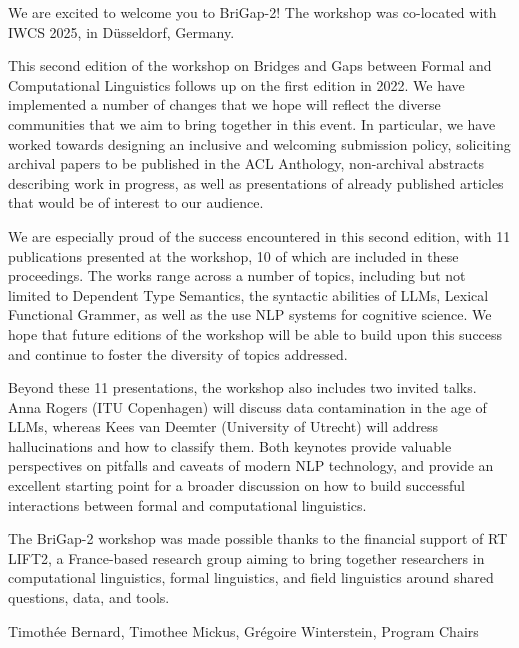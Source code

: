 We are excited to welcome you to BriGap-2!
The workshop was co-located with IWCS 2025, in Düsseldorf, Germany.

This second edition of the workshop on Bridges and Gaps between Formal and Computational Linguistics follows up on the first edition in 2022.
We have implemented a number of changes that we hope will reflect the diverse communities that we aim to bring together in this event.
In particular, we have worked towards designing an inclusive and welcoming submission policy, soliciting archival papers to be published in the ACL Anthology, non-archival abstracts describing work in progress, as well as presentations of already published articles that would be of interest to our audience.

We are especially proud of the success encountered in this second edition, with 11 publications presented at the workshop, 10 of which are included in these proceedings.
The works range across a number of topics, including but not limited to Dependent Type Semantics, the syntactic abilities of LLMs, Lexical Functional Grammer, as well as the use NLP systems for cognitive science.
We hope that future editions of the workshop will be able to build upon this success and continue to foster the diversity of topics addressed.

Beyond these 11 presentations, the workshop also includes two invited talks. 
Anna Rogers (ITU Copenhagen) will discuss data contamination in the age of LLMs, whereas Kees van Deemter (University of Utrecht) will address hallucinations and how to classify them.
Both keynotes provide valuable perspectives on pitfalls and caveats of modern NLP technology, and provide an excellent starting point for a broader discussion on how to build successful interactions between formal and computational linguistics.

The BriGap-2 workshop was made possible thanks to the financial support of RT LIFT2, a France-based research group aiming to bring together researchers in computational linguistics, formal linguistics, and field linguistics around shared questions, data, and tools.

Timothée Bernard, Timothee Mickus, Grégoire Winterstein, Program Chairs
